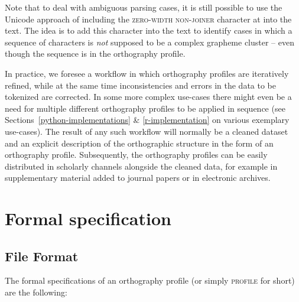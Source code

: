 Note that to deal with ambiguous parsing cases, it is still possible to use the
Unicode approach of including the \textsc{zero-width non-joiner} character at
 into the text. The idea is to add this character into the text to
identify cases in which a sequence of characters is \textit{not} supposed to be
a complex grapheme cluster -- even though the sequence is in the orthography
profile.

In practice, we foresee a workflow in which orthography profiles are iteratively
refined, while at the same time inconsistencies and errors in the data to be
tokenized are corrected. In some more complex use-cases there might even be a
need for multiple different orthography profiles to be applied in sequence (see
Sections~\ref{python-implementations} \& \ref{r-implementation} on various exemplary use-cases). The result of any such
workflow will normally be a cleaned dataset and an explicit description of the
orthographic structure in the form of an orthography profile. Subsequently, the
orthography profiles can be easily distributed in scholarly channels alongside
the cleaned data, for example in supplementary material added to journal papers
or in electronic archives.

\section{Formal specification}
\label{formal-specification-of-orthography-profiles}

\subsection*{File Format}
The formal specifications of an orthography profile (or simply \textsc{profile}
for short) are the following:

